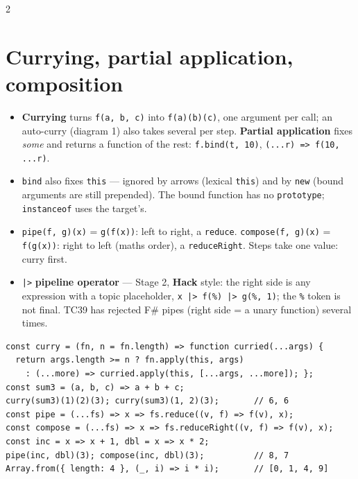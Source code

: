 \documentclass[8pt]{extarticle}
\newcommand\fat{\hbox{=}\hbox{>}}
\newcommand\pipeop{\hbox{|}\hbox{>}}
\begin{document}
\begin{multicols}{2}
\raggedright
\footnotesize{}

\section{Currying, partial application, composition}
\begin{itemize}
  \item \textbf{Currying} turns \texttt{f(a, b, c)} into \texttt{f(a)(b)(c)}, one argument per
        call; an auto-curry (diagram 1) also takes several per step. \textbf{Partial
        application} fixes \emph{some} and returns a function of the rest:
        \texttt{f.bind(t, 10)}, \texttt{(...r) \fat{} f(10, ...r)}.
  \item \texttt{bind} also fixes \texttt{this} — ignored by arrows (lexical \texttt{this}) and
        by \texttt{new} (bound arguments are still prepended). The bound function has no
        \texttt{prototype}; \texttt{instanceof} uses the target's.
  \item \texttt{pipe(f, g)(x)} = \texttt{g(f(x))}: left to right, a \texttt{reduce}.
        \texttt{compose(f, g)(x)} = \texttt{f(g(x))}: right to left (maths order), a
        \texttt{reduceRight}. Steps take one value: curry first.
  \item \texttt{\pipeop} \textbf{pipeline operator} — Stage 2, \textbf{Hack} style: the right
        side is any expression with a topic placeholder, \texttt{x \pipeop{} f(\%) \pipeop{}
        g(\%, 1)}; the \texttt{\%} token is not final. TC39 has rejected F\# pipes (right side =
        a unary function) several times.
\end{itemize}

\begin{lstlisting}[style=js]
const curry = (fn, n = fn.length) => function curried(...args) {
  return args.length >= n ? fn.apply(this, args)
    : (...more) => curried.apply(this, [...args, ...more]); };
const sum3 = (a, b, c) => a + b + c;
curry(sum3)(1)(2)(3); curry(sum3)(1, 2)(3);       // 6, 6
const pipe = (...fs) => x => fs.reduce((v, f) => f(v), x);
const compose = (...fs) => x => fs.reduceRight((v, f) => f(v), x);
const inc = x => x + 1, dbl = x => x * 2;
pipe(inc, dbl)(3); compose(inc, dbl)(3);          // 8, 7
Array.from({ length: 4 }, (_, i) => i * i);       // [0, 1, 4, 9]
\end{lstlisting}


\end{multicols}
\end{document}
